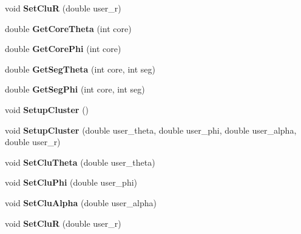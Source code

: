 \begin{DoxyCompactItemize}
void {\bfseries Set\+CluR} (double user\+\_\+r)
\item 
\mbox{\label{class_m_b_geometry_a42aa536f15017724812712b0f8a77c12}} 
double {\bfseries Get\+Core\+Theta} (int core)
\item 
\mbox{\label{class_m_b_geometry_a39f685610ae0e68e547a46f8ef992599}} 
double {\bfseries Get\+Core\+Phi} (int core)
\item 
\mbox{\label{class_m_b_geometry_a49cdf742a2902fc85f0b24dfffa554a8}} 
double {\bfseries Get\+Seg\+Theta} (int core, int seg)
\item 
\mbox{\label{class_m_b_geometry_a575ddd6022d2d686a83ebce3195b6c50}} 
double {\bfseries Get\+Seg\+Phi} (int core, int seg)
\item 
\mbox{\label{class_m_b_geometry_a4d98a38f0dc1ca6a4a73477dde5cdd8d}} 
void {\bfseries Setup\+Cluster} ()
\item 
\mbox{\label{class_m_b_geometry_a93f157cebad3f63dbbefb5b08f3555af}} 
void {\bfseries Setup\+Cluster} (double user\+\_\+theta, double user\+\_\+phi, double user\+\_\+alpha, double user\+\_\+r)
\item 
\mbox{\label{class_m_b_geometry_a9a2a8c9609141be92d7ba30e6087aa30}} 
void {\bfseries Set\+Clu\+Theta} (double user\+\_\+theta)
\item 
\mbox{\label{class_m_b_geometry_a74142f84cf6317d52ae39c0e0ff8a87e}} 
void {\bfseries Set\+Clu\+Phi} (double user\+\_\+phi)
\item 
\mbox{\label{class_m_b_geometry_a0d4868b0360a6e5534918a9813540015}} 
void {\bfseries Set\+Clu\+Alpha} (double user\+\_\+alpha)
\item 
\mbox{\label{class_m_b_geometry_a292c4326421c78871667e91c3694ae35}} 
void {\bfseries Set\+CluR} (double user\+\_\+r)
\item 
\mbox{\label{class_m_b_geometry_a42aa536f15017724812712b0f8a77c12}} 

\end{DoxyCompactItemize}
